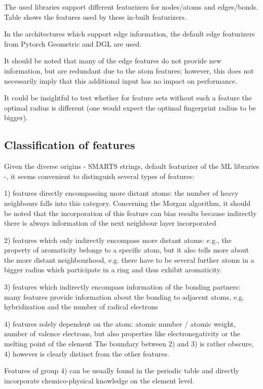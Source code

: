 The used libraries support different featurizers for nodes/atoms and edges/bonds. Table shows the features used by these in-built featurizers.

In the architectures which support edge information, the default edge featurizers from Pytorch Geometric and DGL are used. 

It should be noted that many of the edge features do not provide new information, but are redundant due to the atom features; however, this does not necessarily imply that this additional input has no impact on performance.

It could be insightful to test whether for feature sets without such a feature the optimal radius is different (one would expect the optimal fingerprint radius to be bigger).

\subsection{Classification of features}

Given the diverse origins - SMARTS strings, default featurizer of the ML libraries -, it seems convenient to distinguish several types of features:

1) features directly encompassing more distant atoms: the number of heavy neighbours falls into this category. Concerning the Morgan algorithm, it should be noted that the incorporation of this feature can bias results because indirectly there is always information of the next neighbour layer incorporated

2) features which only indirectly encompass more distant atoms: e.g., the property of aromaticity belongs to a specific atom, but it also tells more about the more distant neighbourhood, e.g. there have to be several further atoms in a bigger radius which participate in a ring and thus exhibit aromaticity.

3) features which indirectly encompass information of the bonding partners: many features provide information about the bonding to adjacent atoms, e.g. hybridization and the number of radical electrons

4) features solely dependent on the atom: atomic number / atomic weight, number of valence electrons, but also properties like electronegativity or the melting point of the element
The boundary between 2) and 3) is rather obscure, 4) however is clearly distinct from the other features.

Features of group 4) can be usually found in the periodic table and directly incorporate chemico-physical knowledge on the element level.

